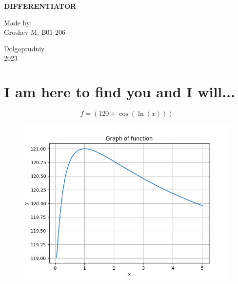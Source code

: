 \documentclass[a4paper, 12pt]{article}
\title{}
\date{}
\begin{document}

    \begin{titlepage}
    \maketitle
    \thispagestyle{empty}

            \begin{center}
                  \Large \textbf{DIFFERENTIATOR}
            \end{center}

             \vspace{20em}
             \begin{flushright}
                 \normalsize Made by: \\
                             Groshev M. B01-206
             \end{flushright}

             \begin{center}
                    \vfill \normalsize Dolgoprudniy \\ 2023
             \end{center}
    \end{titlepage}


\section{I am here to find you and I will...}\begin{equation*}
    f = ({{120}}+{\cos({\ln({{x}})})})
\end{equation*}

\begin{figure}[h!]
        \centering
         \includegraphics[scale=0.5]{./LaTeX/tex_pics/func.png}
\end{figure}
\end{document}
